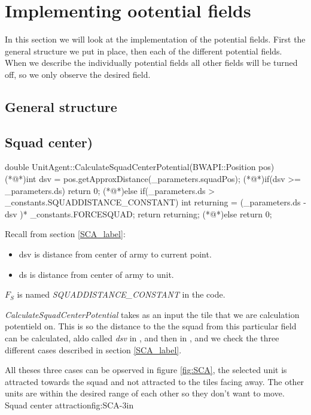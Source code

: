 \section{Implementing ootential fields}
	In this section we will look at the implementation of the potential fields.
	First the general structure we put in place, then each of the different potential fields. When we describe the individually potential fields all other fields will be turned off, so we only observe the desired field.
	
	\subsection{General structure}
	
	
	
	\subsection{Squad center)}	
		\begin{Sourcecode}[caption=Squad center]
double UnitAgent::CalculateSquadCenterPotential(BWAPI::Position pos)
{
	(*@\lnote@*)int dsv = pos.getApproxDistance(_parameters.squadPos);
	(*@\lnote@*)if(dsv >= _parameters.ds){	return 0;	}
	(*@\lnote@*)else if(_parameters.ds > _constants.SQUADDISTANCE_CONSTANT)
	{
		int returning = (_parameters.ds - dsv )* _constants.FORCESQUAD;
		return returning;
	}
	(*@\lnote@*)else{	return 0;	}
}
\end{Sourcecode}

		Recall from section \ref{SCA_label}:
		\begin{itemize}
			\item  dsv is distance from center of army to current point.
			\item  ds is distance from center of army to unit.
		\end{itemize}
		$F_{S}$ is named \textit{SQUADDISTANCE\_CONSTANT} in the code.
		
		\textit{CalculateSquadCenterPotential} takes as an input the tile that we are calculation potentield on. This is so the distance to the the squad from this particular field can be calculated, aldo called \textit{dsv} in , and then in , and  we check the three different cases described in section \ref{SCA_label}.		
		
		All theses three cases can be opserved in figure \ref{fig:SCA}, the selected unit is attracted towards the squad and not attracted to the tiles facing away. The other units are within the desired range of each other so they don't want to move.
			{Squad center attraction}{fig:SCA}{-3in}
			
